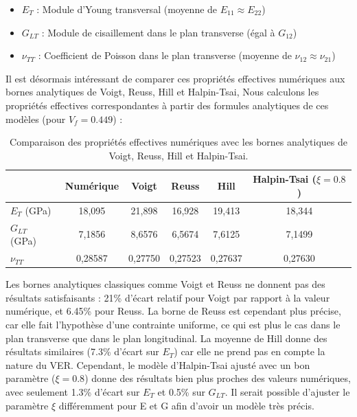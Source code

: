 \documentclass[a4paper,11pt]{article}
\begin{document}
\begin{itemize}
    \item $E_T$ : Module d'Young transversal (moyenne de $E_{11} \approx E_{22}$)
    \item $G_{LT}$ : Module de cisaillement dans le plan transverse (égal à $G_{12}$)
    \item $\nu_{TT}$ : Coefficient de Poisson dans le plan transverse (moyenne de $\nu_{12} \approx \nu_{21}$)
\end{itemize}

\vspace{0.1cm}
 Il est désormais intéressant de comparer ces propriétés effectives numériques aux bornes analytiques de Voigt, Reuss, Hill et Halpin-Tsai, Nous calculons les propriétés effectives correspondantes à partir des formules analytiques de ces modèles (pour $V_f = 0.449$) :
\begin{table}[H]
    \centering
    \begin{tabular}{|l|c|c|c|c|c|}
        \hline
        & \textbf{Numérique} & \textbf{Voigt} & \textbf{Reuss} & \textbf{Hill} & \textbf{Halpin-Tsai ($\xi = 0.8$)} \\
        \hline
        $E_T$ (GPa) & 18,095 & 21,898 & 16,928 & 19,413 & 18,344 \\
        $G_{LT}$ (GPa) & 7,1856 & 8,6576 & 6,5674 & 7,6125 & 7,1499 \\
        $\nu_{TT}$ & 0,28587 & 0,27750 & 0,27523 & 0,27637 & 0,27630 \\
        \hline
    \end{tabular}
    \caption{Comparaison des propriétés effectives numériques avec les bornes analytiques de Voigt, Reuss, Hill et Halpin-Tsai.}
    \label{tab:homo_bounds}
\end{table}

Les bornes analytiques classiques comme Voigt et Reuss ne donnent pas des résultats satisfaisants : 21\% d'écart relatif pour Voigt par rapport à la valeur numérique, et 6.45\% pour Reuss. La borne de Reuss est cependant plus précise, car elle fait l'hypothèse d'une contrainte uniforme, ce qui est plus le cas dans le plan transverse que dans le plan longitudinal. La moyenne de Hill donne des résultats similaires (7.3\% d'écart sur $E_T$) car elle ne prend pas en compte la nature du VER. Cependant, le modèle d'Halpin-Tsai ajusté avec un bon paramètre ($\xi = 0.8$) donne des résultats bien plus proches des valeurs numériques, avec seulement 1.3\% d'écart sur $E_T$ et 0.5\% sur $G_{LT}$. Il serait possible d'ajuster le paramètre $\xi$ différemment pour E et G afin d'avoir un modèle très précis. \\
\end{document}
